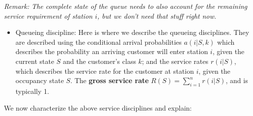 \documentclass[12pt,titlepage]{article}
\theoremstyle{plain}
\theoremstyle{definition}
\theoremstyle{remark}
\begin{document}
\emph{Remark: The complete state of the queue needs to also account for the remaining service requirement of station $i$, but we don't need that stuff right now.}

\begin{itemize}%
\item Queueing discipline: Here is where we describe the queueing disciplines. They are described using the conditional arrival probabilities $a(i|S,k)$ which describes the probability an arriving customer will enter station $i$, given the current state $S$ and the customer's class $k$; and the service rates $r(i|S)$, which describes the service rate for the customer at station $i$, given the occupancy state $S$. The \textbf{gross service rate} $R(S) = \sum_{i=1}^{n}r(i|S)$, and is typically 1.

\end{itemize}
We now characterize the above service disciplines and explain:
\end{document}
